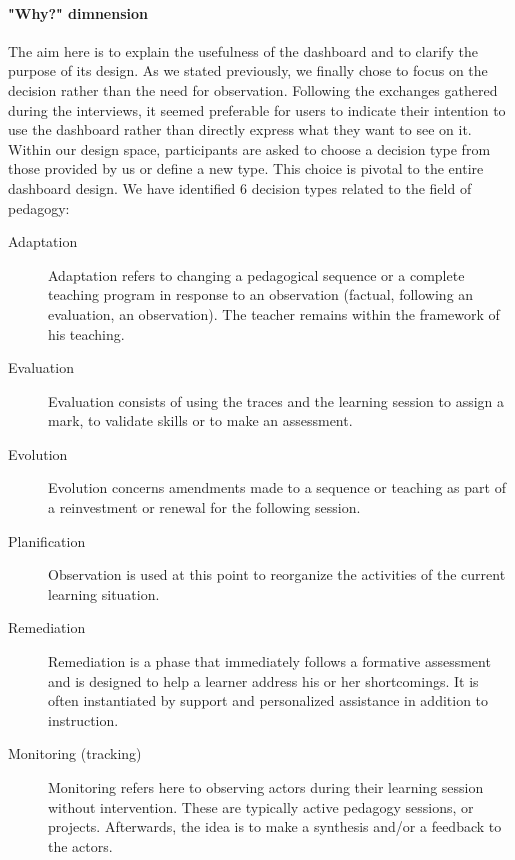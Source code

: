 \documentclass[preprint,12pt]{elsarticle}
\begin{document}
\paragraph{"Why?" dimnension}
The aim here is to explain the usefulness of the dashboard and to clarify the purpose of its design. As we stated previously, we finally chose to focus on the decision rather than the need for observation. Following the exchanges gathered during the interviews, it seemed preferable for users to indicate their intention to use the dashboard rather than directly express what they want to see on it. Within our design space, participants are asked to choose a decision type from those provided by us or define a new type. This choice is pivotal to the entire dashboard design. We have identified 6 decision types related to the field of pedagogy:
\begin{description}
    \item[Adaptation] Adaptation refers to changing a pedagogical sequence or a complete teaching program in response to an observation (factual, following an evaluation, an observation). The teacher remains within the framework of his teaching.
    \item[Evaluation] Evaluation consists of using the traces and the learning session to assign a mark, to validate skills or to make an assessment.
    \item[Evolution]  Evolution concerns amendments made to a sequence or teaching as part of a reinvestment or  renewal for the following session.
    \item[Planification] Observation is used at this point to reorganize the activities of the current learning situation.
    \item[Remediation] Remediation is a phase that immediately follows a formative assessment and is designed to help a learner address his or her shortcomings. It is often instantiated by support and personalized assistance in addition to instruction.
    \item[Monitoring (tracking)] Monitoring refers here to observing actors during their learning session without intervention. These are typically active pedagogy sessions, or projects. Afterwards, the idea is to make a synthesis and/or a feedback to the actors. 
\end{description}
\end{document}
